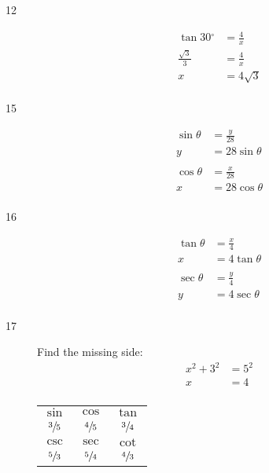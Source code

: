 \documentclass{exam}
\newcommand{\dg}{\ensuremath{^\circ}}
\begin{document}
\begin{description}
      \item[12]
        \begin{align*}
          \tan 30 \dg    & = \frac{4}{x} \\
          \frac{\sqrt{3}}{3} & = \frac{4}{x}  \\
          x                  & = \boxed{ 4 \sqrt{3} } \\
        \end{align*}

      \item[15]
        \begin{align*}
          \sin \theta & = \frac{y}{28} \\
          y           & = \boxed{ 28 \sin \theta } \\
          \\
          \cos \theta & = \frac{x}{28} \\
          x           & = \boxed{ 28 \cos \theta } \\
        \end{align*}

      \item[16]
        \begin{align*}
          \tan \theta & = \frac{x}{4} \\
          x           & = \boxed{ 4 \tan \theta } \\
          \\
          \sec \theta & = \frac{y}{4} \\
          y           & = \boxed{ 4 \sec \theta } \\
        \end{align*}

      \item[17] 
        Find the missing side:
        \begin{align*}
          x^2 + 3^2 & = 5^2 \\
          x         & = 4 \\
        \end{align*}

        \begin{tabular}[H]{ccc}
          \toprule

          $\sin$         & $\cos$         & $\tan$         \\
          $\sfrac{3}{5}$ & $\sfrac{4}{5}$ & $\sfrac{3}{4}$ \\

          \midrule

          $\csc$         & $\sec$         & $\cot$ \\
          $\sfrac{5}{3}$ & $\sfrac{5}{4}$ & $\sfrac{4}{3}$ \\


\end{tabular}
\end{description}
\end{document}
